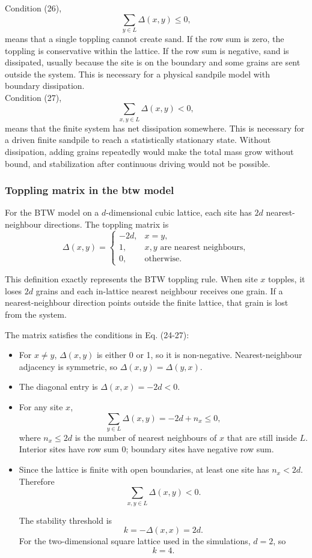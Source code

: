 \documentclass{article}
\begin{document}
Condition (26),
\[
\sum_{y\in L}\Delta(x,y)\le 0,
\]
means that a single toppling cannot create sand. If the row sum is zero, the toppling is conservative within the lattice. If the row sum is negative, sand is dissipated, usually because the site is on the boundary and some grains are sent outside the system. This is necessary for a physical sandpile model with boundary dissipation. \\

Condition (27),
\[
\sum_{x,y\in L}\Delta(x,y)<0,
\]
means that the finite system has net dissipation somewhere. This is necessary for a driven finite sandpile to reach a statistically stationary state. Without dissipation, adding grains repeatedly would make the total mass grow without bound, and stabilization after continuous driving would not be possible.

\subsubsection{Toppling matrix in the btw model}

For the BTW model on a \(d\)-dimensional cubic lattice, each site has \(2d\) nearest-neighbour directions. The toppling matrix is
\[
\Delta(x,y)=
\begin{cases}
-2d, & x=y,\\
1, & x,y\text{ are nearest neighbours},\\
0, & \text{otherwise}.
\end{cases}
\]

This definition exactly represents the BTW toppling rule. When site \(x\) topples, it loses \(2d\) grains and each in-lattice nearest neighbour receives one grain. If a nearest-neighbour direction points outside the finite lattice, that grain is lost from the system.

The matrix satisfies the conditions in Eq. (24-27):

\begin{itemize}
    \item For \(x\ne y\), \(\Delta(x,y)\) is either 0 or 1, so it is non-negative. Nearest-neighbour adjacency is symmetric, so \(\Delta(x,y)=\Delta(y,x)\).
    \item The diagonal entry is \(\Delta(x,x)=-2d<0\).
    \item For any site \(x\),
  \[
  \sum_{y\in L}\Delta(x,y)=-2d+n_x\le 0,
  \]
  where \(n_x\le 2d\) is the number of nearest neighbours of \(x\) that are still inside \(L\). Interior sites have row sum 0; boundary sites have negative row sum.
  \item Since the lattice is finite with open boundaries, at least one site has \(n_x<2d\). Therefore
  \[
  \sum_{x,y\in L}\Delta(x,y)<0.
  \]

The stability threshold is
\[
k=-\Delta(x,x)=2d.
\]
For the two-dimensional square lattice used in the simulations, \(d=2\), so
\[
k=4.
\]
\end{itemize}
\end{document}
